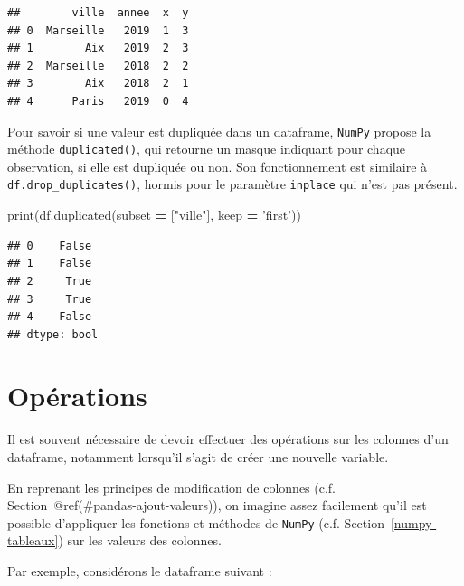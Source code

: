 \documentclass[12pt,]{book}
\newenvironment{Shaded}{\begin{snugshade}}{\end{snugshade}}
\newcommand{\StringTok}[1]{\textcolor[rgb]{0.31,0.60,0.02}{#1}}
\newcommand{\OperatorTok}[1]{\textcolor[rgb]{0.81,0.36,0.00}{\textbf{#1}}}
\newcommand{\BuiltInTok}[1]{#1}
\newcommand{\NormalTok}[1]{#1}
\numberwithin{equation}{section}
\numberwithin{countremarque}{section}
\begin{document}
\begin{lstlisting}
##        ville  annee  x  y
## 0  Marseille   2019  1  3
## 1        Aix   2019  2  3
## 2  Marseille   2018  2  2
## 3        Aix   2018  2  1
## 4      Paris   2019  0  4
\end{lstlisting}

Pour savoir si une valeur est dupliquée dans un dataframe,
\texttt{NumPy} propose la méthode \texttt{duplicated()}, qui retourne un
masque indiquant pour chaque observation, si elle est dupliquée ou non.
Son fonctionnement est similaire à \texttt{df.drop\_duplicates()},
hormis pour le paramètre \texttt{inplace} qui n'est pas présent.

\begin{Shaded}
\begin{Highlighting}[]
\BuiltInTok{print}\NormalTok{(df.duplicated(subset }\OperatorTok{=}\NormalTok{ [}\StringTok{"ville"}\NormalTok{], keep }\OperatorTok{=} \StringTok{'first'}\NormalTok{))}
\end{Highlighting}
\end{Shaded}

\begin{lstlisting}
## 0    False
## 1    False
## 2     True
## 3     True
## 4    False
## dtype: bool
\end{lstlisting}

\section{Opérations}\label{operations}

Il est souvent nécessaire de devoir effectuer des opérations sur les
colonnes d'un dataframe, notamment lorsqu'il s'agit de créer une
nouvelle variable.

En reprenant les principes de modification de colonnes (c.f.
Section~@ref(\#pandas-ajout-valeurs)), on imagine assez facilement qu'il
est possible d'appliquer les fonctions et méthodes de \texttt{NumPy}
(c.f. Section~\ref{numpy-tableaux}) sur les valeurs des colonnes.

Par exemple, considérons le dataframe suivant :
\end{document}
